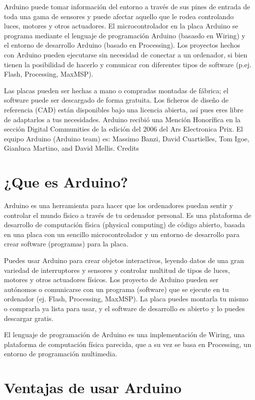 \documentclass[12pt,a4paper]{report}
\begin{document}
Arduino puede tomar información del entorno a través de sus pines de entrada de toda una gama de sensores y puede afectar aquello que le rodea controlando luces, motores y otros actuadores. El microcontrolador en la placa Arduino se programa mediante el lenguaje de programación Arduino (basasdo en Wiring) y el entorno de desarrollo Arduino (basado en Processing). Los proyectos hechos con Arduino pueden ejecutarse sin necesidad de conectar a un ordenador, si bien tienen la posibilidad de hacerlo y comunicar con diferentes tipos de software (p.ej. Flash, Processing, MaxMSP).

Las placas pueden ser hechas a mano o compradas montadas de fábrica; el software puede ser descargado de forma gratuita. Los ficheros de diseño de referencia (CAD) están disponibles bajo una licencia abierta, así pues eres libre de adaptarlos a tus necesidades.
Arduino recibió una Mención Honorífica en la sección Digital Communities de la edición del 2006 del Ars Electronica Prix. El equipo Arduino (Arduino team) es: Massimo Banzi, David Cuartielles, Tom Igoe, Gianluca Martino, and David Mellis. Credits

\section{¿Que es Arduino?}

Arduino es una herramienta para hacer que los ordenadores puedan sentir y controlar el mundo físico a través de tu ordenador personal. Es una plataforma de desarrollo de computación física (physical computing) de código abierto, basada en una placa con un sencillo microcontrolador y un entorno de desarrollo para crear software (programas) para la placa.

Puedes usar Arduino para crear objetos interactivos, leyendo datos de una gran variedad de interruptores y sensores y controlar multitud de tipos de luces, motores y otros actuadores físicos. Los proyecto de Arduino pueden ser autónomos o comunicarse con un programa (software) que se ejecute en tu ordenador (ej. Flash, Processing, MaxMSP). La placa puedes montarla tu mismo o comprarla ya lista para usar, y el software de desarrollo es abierto y lo puedes descargar gratis.

El lenguaje de programación de Arduino es una implementación de Wiring, una plataforma de computación física parecida, que a su vez se basa en Processing, un entorno de programación multimedia.


\section{Ventajas de usar Arduino}
\end{document}
